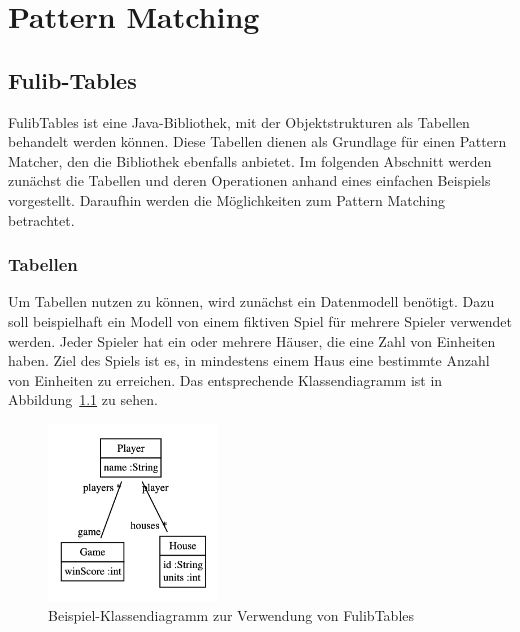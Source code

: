 \chapter{Pattern Matching}\label{ch:pattern-matching}


\section{Fulib-Tables}\label{sec:fulib-tables}

FulibTables\cite{fulibTables} ist eine Java-Bibliothek, mit der Objektstrukturen als Tabellen behandelt werden können.
Diese Tabellen dienen als Grundlage für einen Pattern Matcher, den die Bibliothek ebenfalls anbietet.
Im folgenden Abschnitt werden zunächst die Tabellen und deren Operationen anhand eines einfachen Beispiels vorgestellt.
Daraufhin werden die Möglichkeiten zum Pattern Matching betrachtet.

\subsection{Tabellen}\label{subsec:tables}

Um Tabellen nutzen zu können, wird zunächst ein Datenmodell benötigt.
Dazu soll beispielhaft ein Modell von einem fiktiven Spiel für mehrere Spieler verwendet werden.
Jeder Spieler hat ein oder mehrere Häuser, die eine Zahl von Einheiten haben.
Ziel des Spiels ist es, in mindestens einem Haus eine bestimmte Anzahl von Einheiten zu erreichen.
Das entsprechende Klassendiagramm ist in Abbildung~\ref{fig:game-class-diagram} zu sehen.

\begin{figure}
    \centering
    \includegraphics[width=0.4\textwidth]{chapter/pattern-matching/img/game-class-diagram.png}
    \caption{Beispiel-Klassendiagramm zur Verwendung von FulibTables}
    \label{fig:game-class-diagram}
\end{figure}

